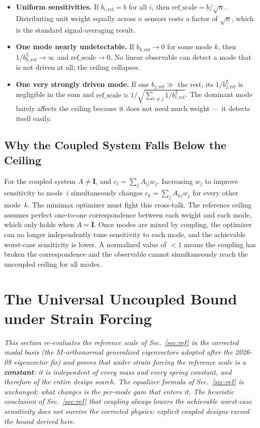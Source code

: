 \documentclass[11pt, letterpaper]{article}
\newcommand{\refsys}{\mathrm{ref}}
\newcommand{\bref}{b_{i,\refsys}}
\newcommand{\refscale}{\mathrm{ref\_scale}}
\begin{document}
\begin{itemize}[noitemsep]
  \item \textbf{Uniform sensitivities.}  If $\bref = b$ for all $i$, then
        $\refscale = b/\sqrt{n}$.  Distributing unit weight equally across
        $n$ sensors costs a factor of $\sqrt{n}$, which is the standard
        signal-averaging result.
  \item \textbf{One mode nearly undetectable.}  If $b_{k,\refsys} \to 0$
        for some mode $k$, then $1/b_{k,\refsys}^2 \to \infty$ and
        $\refscale \to 0$.  No linear observable can detect a mode that is
        not driven at all; the ceiling collapses.
  \item \textbf{One very strongly driven mode.}  If one $b_{j,\refsys} \gg$
        the rest, its $1/b_{j,\refsys}^2$ is negligible in the sum and
        $\refscale \approx 1/\sqrt{\sum_{i\neq j} 1/b_{i,\refsys}^2}$.  The
        dominant mode barely affects the ceiling because it does not need
        much weight --- it detects itself easily.
\end{itemize}

\subsection{Why the Coupled System Falls Below the Ceiling}

For the coupled system $A \neq \mathbf{I}$, and
$c_i = \sum_j A_{ij} w_j$.  Increasing $w_j$ to improve sensitivity to
mode~$i$ simultaneously changes $c_k = \sum_j A_{kj} w_j$ for every
other mode~$k$.  The minimax optimizer must fight this cross-talk.  The
reference ceiling assumes perfect one-to-one correspondence between each
weight and each mode, which only holds when $A = \mathbf{I}$.  Once modes
are mixed by coupling, the optimizer can no longer independently tune
sensitivity to each mode, and the achievable worst-case sensitivity is
lower.  A normalized value of $< 1$ means the coupling has broken the
correspondence and the observable cannot simultaneously reach the uncoupled
ceiling for all modes.

\section{The Universal Uncoupled Bound under Strain Forcing}
\label{sec:universal-bound}

\emph{This section re-evaluates the reference scale of
Sec.~\ref{sec:ref} in the corrected modal basis (the $M$-orthonormal
generalized eigenvectors adopted after the 2026-08 eigenvector fix) and
proves that under strain forcing the reference scale is a
\textbf{constant}: it is independent of every mass and every spring
constant, and therefore of the entire design search.  The equalizer
formula of Sec.~\ref{sec:ref} is unchanged; what changes is the per-mode
gain that enters it.  The heuristic conclusion of
Sec.~\ref{sec:ref} that coupling always lowers the achievable worst-case
sensitivity does \emph{not} survive the corrected physics: explicit
coupled designs exceed the bound derived here.}
\end{document}
